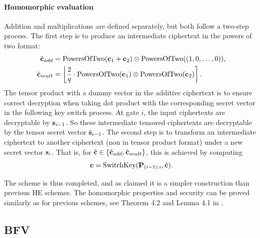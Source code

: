 \documentclass[../main.tex]{subfiles}
\begin{document}
\paragraph{Homomorphic evaluation} Addition and multiplications are defined separately, but both follow a two-step process. The first step is to produce an intermediate ciphertext in the powers of two format: 
\begin{align*}
    \tilde{\mathbf{c}}_{add} &= \text{PowersOfTwo}(\mathbf{c}_1+\mathbf{c}_2) \otimes \text{PowersOfTwo}((1,0,\dots,0)), \\
    \tilde{\mathbf{c}}_{mult} &= \left\lfloor{\frac{2}{q} \cdot \text{PowersOfTwo}(\mathbf{c}_1) \otimes \text{PowersOfTwo}(\mathbf{c}_2)}\right\rceil. \\
\end{align*}
The tensor product with a dummy vector in the additive ciphertext is to ensure correct decryption when taking dot product with the corresponding secret vector in the following key switch process. 
At gate $i$, the input ciphertexts are decryptable by $\mathbf{s}_{i-1}$. So these intermediate tensored ciphertexts are decryptable by the tensor secret vector $\tilde{\mathbf{s}}_{i-1}$. The second step is to transform an intermediate ciphertext to another ciphertext (non in tensor product format) under a new secret vector $\mathbf{s}_i$. That is, for $\tilde{\mathbf{c}} \in \{\tilde{\mathbf{c}}_{add}, \tilde{\mathbf{c}}_{mult}\}$, this is achieved by computing
\begin{align*}
    \mathbf{c} = \text{SwitchKey}(\mathbf{P}_{(i-1):i}, \tilde{\mathbf{c}}).
\end{align*}

The scheme is thus completed, and as claimed it is a simpler construction than previous HE schemes. The homomorphic properties and security can be proved similarly as for previous schemes, see Theorem 4.2 and Lemma 4.1 in \cite{brakerski2012fully}.  



\subsection{BFV}
\end{document}
